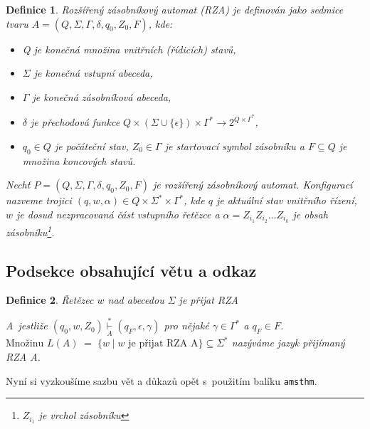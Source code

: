 \documentclass[a4paper, twocolumn, 11pt]{article}
\newtheorem{definition}{Definice}
\begin{document}
\begin{definition}\label{definice1}
	\emph{Rozšířený zásobníkový automat} (RZA) je definován jako sedmice tvaru
	$A = (Q,\Sigma,\Gamma,\delta,q_0,Z_0,F)$, kde:

	\begin{itemize}

		\item[$\bullet$] Q je konečná množina \emph{vnitřních (řídicích) stavů,}
		\item[$\bullet$] $\Sigma$ je konečná \emph{vstupní abeceda,}
		\item[$\bullet$] $\Gamma$ je konečná \emph{zásobníková abeceda,}
		\item[$\bullet$] $\delta$ je \emph{přechodová funkce} $Q\times(\Sigma\cup\{\epsilon\})\times\Gamma^\ast \rightarrow2^{Q\times\Gamma^\ast}$,
		\item[$\bullet$] $q_0\in Q$ je \emph{počáteční stav}, $Z_0\in \Gamma$ je \emph{startovací symbol zásobníku} a $F \subseteq Q$ je množina \emph{koncových stavů.}

	\end{itemize}

	\emph{Nechť $P=(Q,\Sigma,\Gamma,\delta,q_0,Z_0,F)$ je rozšířený zásobníkový automat.} Konfigurací \emph{nazveme trojici $(q,w,\alpha) \in Q \times \Sigma^\ast \times \Gamma^\ast$, kde $q$ je aktuální stav vnitřního řízení, $w$ je dosud nezpracovaná část vstupního řetězce a $\alpha = Z_{i_{1}}Z_{i_{2}}\dots Z_{i_{k}}$ je obsah zásobníku\footnote{$Z_{i_{1}}$ je vrchol zásobníku}.}

\end{definition}


\subsection{Podsekce obsahující větu a odkaz}

\begin{definition}\label{definice2}
	\emph{Řetězec $w$ nad abecedou $\Sigma$ je přijat RZA}

	\noindent A~jestliže $(q_0,w,Z_0)\overset{*}{\underset{A}\vdash} (q_F,\epsilon,\gamma)$ pro nějaké $\gamma \in \Gamma^\ast$ a $q_F \in F$. $\text{Množinu } L(A)\; = \; \{w \mid w \text{ je přijat RZA A}\} \subseteq \Sigma^\ast$ nazýváme \emph{jazyk přijímaný RZA} A.

\end{definition}

Nyní si vyzkoušíme sazbu vět a důkazů opět s~použitím balíku \verb|amsthm|.
\end{document}
